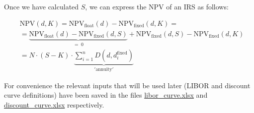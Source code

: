 Once we have calculated \(S\), we can express the \(\mathrm{NPV}\) of an
IRS as follows:

\begin{equation}
\begin{split}&\mathrm{NPV}(d, K) = \mathrm{NPV}_{\mathrm{float}}(d) - \mathrm{NPV}_{\mathrm{fixed}}(d, K) = \\ 
&= \underbrace{\mathrm{NPV}_{\mathrm{float}}(d) - \mathrm{NPV}_{\mathrm{fixed}}(d, S)}_{\mathrm{=\;0}} + \mathrm{NPV}_{\mathrm{fixed}}(d, S) - \mathrm{NPV}_{\mathrm{fixed}}(d, K) \\ 
& = N\cdot(S-K)\cdot\underbrace{\sum_{i=1}^{n}D(d, d_{i}^{\mathrm{fixed}})}_{\mathrm{'annuity'}}
\end{split}
\end{equation}

For convenience the relevant inputs that will be used later (LIBOR and discount curve definitions) have been saved in the files \href{https://drive.google.com/file/d/1dm5oZnZKmJM6UrV0L32OcqD5Tzs9SI9A/view?usp=sharing}{libor\_curve.xlsx} and \href{https://drive.google.com/file/d/14R22r7m-6VpQ_P79D3qHdK0QN_mOQ_UB/view?usp=sharing}{discount\_curve.xlsx} respectively.

